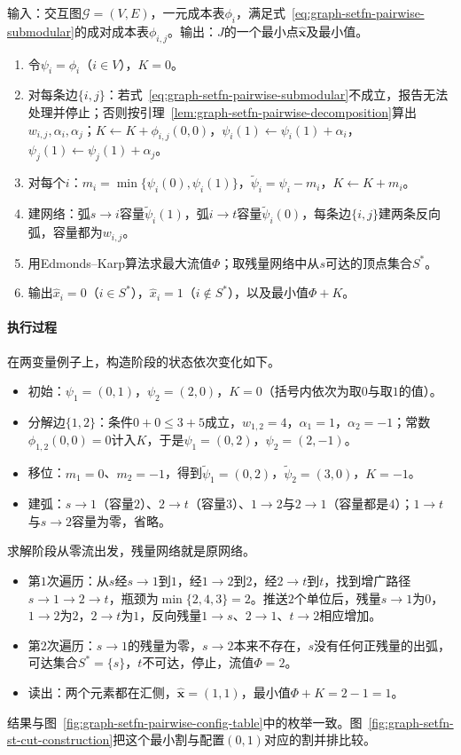 \begin{algorithm}[成对二值函数的图割最小化]
\label{alg:graph-setfn-graph-cut}
输入：交互图$\mathcal G=(V,E)$，一元成本表$\phi_i$，满足式~\eqref{eq:graph-setfn-pairwise-submodular}的成对成本表$\phi_{i,j}$。输出：$J$的一个最小点$\hat{\bm x}$及最小值。
\begin{enumerate}
  \item 令$\psi_i=\phi_i$（$i\in V$），$K=0$。
  \item 对每条边$\{i,j\}$：若式~\eqref{eq:graph-setfn-pairwise-submodular}不成立，报告无法处理并停止；否则按引理~\ref{lem:graph-setfn-pairwise-decomposition}算出$w_{i,j},\alpha_i,\alpha_j$；$K\gets K+\phi_{i,j}(0,0)$，$\psi_i(1)\gets\psi_i(1)+\alpha_i$，$\psi_j(1)\gets\psi_j(1)+\alpha_j$。
  \item 对每个$i$：$m_i=\min\{\psi_i(0),\psi_i(1)\}$，$\tilde\psi_i=\psi_i-m_i$，$K\gets K+m_i$。
  \item 建网络：弧$s\to i$容量$\tilde\psi_i(1)$，弧$i\to t$容量$\tilde\psi_i(0)$，每条边$\{i,j\}$建两条反向弧，容量都为$w_{i,j}$。
  \item 用Edmonds--Karp算法求最大流值$\Phi$；取残量网络中从$s$可达的顶点集合$S^\ast$。
  \item 输出$\hat x_i=0$（$i\in S^\ast$），$\hat x_i=1$（$i\notin S^\ast$），以及最小值$\Phi+K$。
\end{enumerate}
\end{algorithm}

\paragraph{执行过程}
在两变量例子上，构造阶段的状态依次变化如下。
\begin{itemize}
  \item 初始：$\psi_1=(0,1)$，$\psi_2=(2,0)$，$K=0$（括号内依次为取$0$与取$1$的值）。
  \item 分解边$\{1,2\}$：条件$0+0\leq3+5$成立，$w_{1,2}=4$，$\alpha_1=1$，$\alpha_2=-1$；常数$\phi_{1,2}(0,0)=0$计入$K$，于是$\psi_1=(0,2)$，$\psi_2=(2,-1)$。
  \item 移位：$m_1=0$、$m_2=-1$，得到$\tilde\psi_1=(0,2)$，$\tilde\psi_2=(3,0)$，$K=-1$。
  \item 建弧：$s\to1$（容量$2$）、$2\to t$（容量$3$）、$1\to2$与$2\to1$（容量都是$4$）；$1\to t$与$s\to2$容量为零，省略。
\end{itemize}
求解阶段从零流出发，残量网络就是原网络。
\begin{itemize}
  \item 第$1$次遍历：从$s$经$s\to1$到$1$，经$1\to2$到$2$，经$2\to t$到$t$，找到增广路径$s\to1\to2\to t$，瓶颈为$\min\{2,4,3\}=2$。推送$2$个单位后，残量$s\to1$为$0$，$1\to2$为$2$，$2\to t$为$1$，反向残量$1\to s$、$2\to1$、$t\to2$相应增加。
  \item 第$2$次遍历：$s\to1$的残量为零，$s\to2$本来不存在，$s$没有任何正残量的出弧，可达集合$S^\ast=\{s\}$，$t$不可达，停止，流值$\Phi=2$。
  \item 读出：两个元素都在汇侧，$\hat{\bm x}=(1,1)$，最小值$\Phi+K=2-1=1$。
\end{itemize}
结果与图~\ref{fig:graph-setfn-pairwise-config-table}中的枚举一致。图~\ref{fig:graph-setfn-st-cut-construction}把这个最小割与配置$(0,1)$对应的割并排比较。


